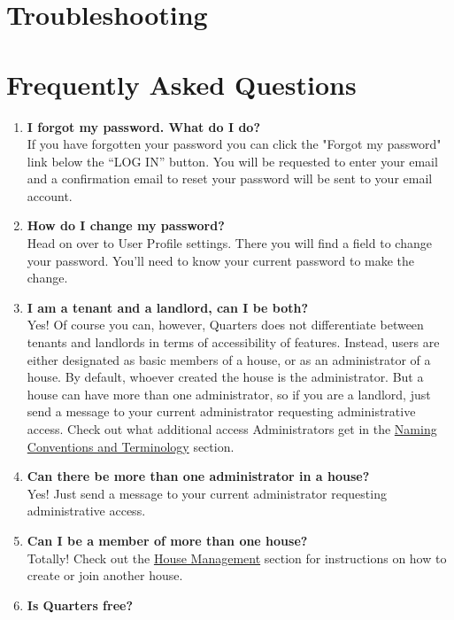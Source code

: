\documentclass[12pt]{article}
\begin{document}
    \section{Troubleshooting}

    \section{Frequently Asked Questions}
    \begin{enumerate}
    \item \textbf{I forgot my password. What do I do?} \\
    If you have forgotten your password you can click the "Forgot my password" link below the ``LOG IN'' button. You will be requested to enter your email and a confirmation email to reset your password will be sent to your email account.
    \item \textbf{How do I change my password?} \\
    Head on over to User Profile settings. There you will find a field to change your password. You'll need to know your current password to make the change.
    \item \textbf{I am a tenant and a landlord, can I be both?} \\
    Yes! Of course you can, however, Quarters does not differentiate between tenants and landlords in terms of accessibility of features. Instead, users are either designated as basic members of a house, or as an administrator of a house. By default, whoever created the house is the administrator. But a house can have more than one administrator, so if you are a landlord, just send a message to your current administrator requesting administrative access. Check out what additional access Administrators get in the \hyperref[sec:conventions]{Naming Conventions and Terminology} section. 
    \item \textbf{Can there be more than one administrator in a house?} \\
    Yes! Just send a message to your current administrator requesting administrative access.
    \item \textbf{Can I be a member of more than one house?} \\
    Totally! Check out the \hyperref[sec:housemanagement]{House Management}  section for instructions on how to create or join another house.
    \item \textbf{Is Quarters free?} \\
    
    \end{enumerate}

\end{document}
